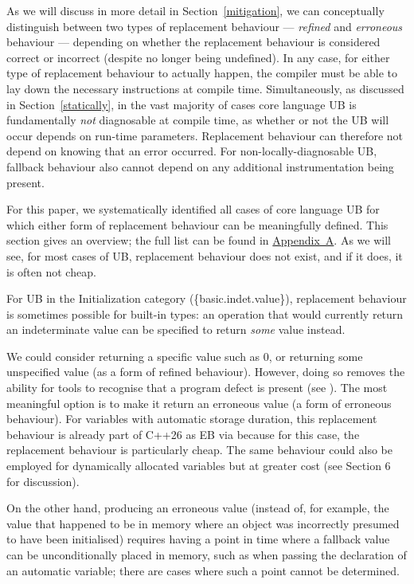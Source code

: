 As we will discuss in more detail in Section~\ref{mitigation}, we can conceptually distinguish between two types of replacement behaviour --- \emph{refined} and \emph{erroneous} behaviour --- depending on whether the replacement behaviour is considered correct or incorrect (despite no longer being undefined). In any case, for either type of replacement behaviour to actually happen, the compiler must be able to lay down the necessary instructions at compile time. Simultaneously, as discussed in Section~\ref{statically}, in the vast majority of cases core language UB is fundamentally \emph{not} diagnosable at compile time, as whether or not the UB will occur depends on run-time parameters. Replacement behaviour can therefore not depend on knowing that an error occurred. For non-locally-diagnosable UB, fallback behaviour also cannot depend on any additional instrumentation being present.

For this paper, we systematically identified all cases of core language UB for which either form of replacement behaviour can be meaningfully defined. This section gives an overview; the full list can be found in \hyperref[appendix]{Appendix~A}. As we will see, for most cases of UB, replacement behaviour does not exist, and if it does, it is often not cheap.

For UB in the Initialization category (\{basic.indet.value\}), replacement behaviour is sometimes possible for built-in types: an operation that would currently return an indeterminate value can be specified to return \emph{some} value instead.

We could consider returning a specific value such as 0, or returning some unspecified value (as a form of refined behaviour). However, doing so removes the ability for tools to recognise that a program defect is present (see \cite{P2754R0}). The most meaningful option is to make it return an erroneous value (a form of erroneous behaviour). For variables with automatic storage duration, this replacement behaviour is already part of C++26 as EB via \cite{P2795R5} because for this case, the replacement behaviour is particularly cheap. The same  behaviour could also be employed for dynamically allocated variables but at greater cost (see \cite{P2723R1} Section 6 for discussion).

On the other hand, producing an erroneous value (instead of, for example, the value that happened to be in memory where an object was incorrectly presumed to have been initialised) requires having a point in time where a fallback value can be unconditionally placed in memory, such as when passing the declaration of an automatic variable; there are cases where such a point cannot be determined.

